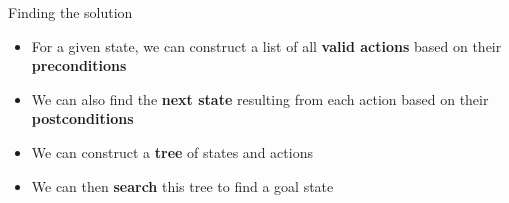 \begin{frame}{Finding the solution}
	\begin{itemize}
		\pause\item For a given state, we can construct a list of all \textbf{valid actions}
			based on their \textbf{preconditions}
		\pause\item We can also find the \textbf{next state} resulting from each action
			based on their \textbf{postconditions}
		\pause\item We can construct a \textbf{tree} of states and actions
		\pause\item We can then \textbf{search} this tree to find a goal state
	\end{itemize}
\end{frame}

